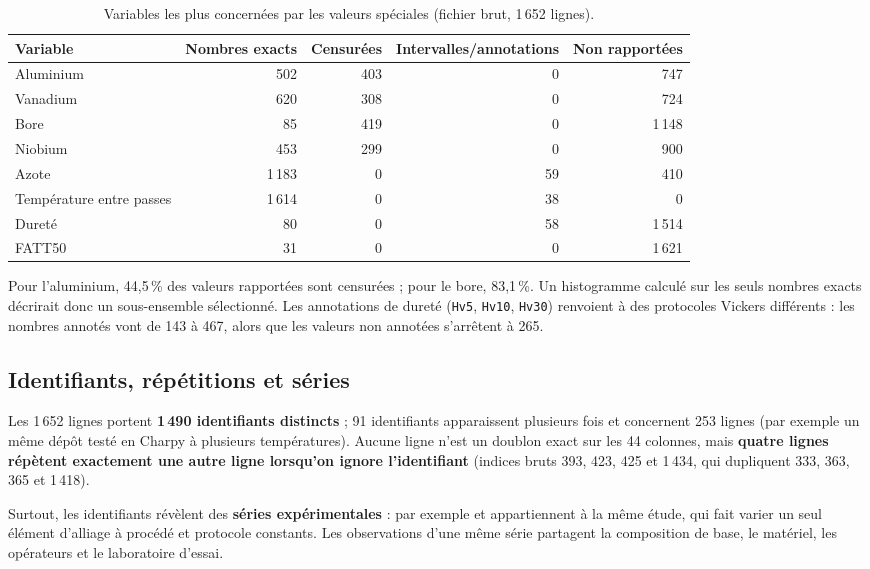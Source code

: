 \begin{table}[htbp]
\centering
\small
\caption{Variables les plus concernées par les valeurs spéciales (fichier brut, 1\,652 lignes).}
\label{tab:speciales}
\begin{tabular}{@{}lrrrr@{}}
\toprule
Variable & Nombres exacts & Censurées & Intervalles/annotations & Non rapportées \\
\midrule
Aluminium                 & 502   & 403 & 0  & 747   \\
Vanadium                  & 620   & 308 & 0  & 724   \\
Bore                      & 85    & 419 & 0  & 1\,148 \\
Niobium                   & 453   & 299 & 0  & 900   \\
Azote                     & 1\,183 & 0  & 59 & 410   \\
Température entre passes  & 1\,614 & 0  & 38 & 0     \\
Dureté                    & 80    & 0   & 58 & 1\,514 \\
FATT50                    & 31    & 0   & 0  & 1\,621 \\
\bottomrule
\end{tabular}
\end{table}

Pour l'aluminium, 44,5\,\% des valeurs rapportées sont censurées ; pour le bore,
83,1\,\%. Un histogramme calculé sur les seuls nombres exacts décrirait donc un
sous-ensemble sélectionné. Les annotations de dureté (\texttt{Hv5}, \texttt{Hv10},
\texttt{Hv30}) renvoient à des protocoles Vickers différents : les nombres
annotés vont de 143 à 467, alors que les valeurs non annotées s'arrêtent à 265.

\subsection{Identifiants, répétitions et séries}
\label{subsec:eda_series}

Les 1\,652 lignes portent \textbf{1\,490 identifiants distincts} ; 91 identifiants
apparaissent plusieurs fois et concernent 253 lignes (par exemple un même dépôt
testé en Charpy à plusieurs températures). Aucune ligne n'est un doublon exact sur
les 44 colonnes, mais \textbf{quatre lignes répètent exactement une autre ligne
lorsqu'on ignore l'identifiant} (indices bruts 393, 423, 425 et 1\,434, qui
dupliquent 333, 363, 365 et 1\,418).

Surtout, les identifiants révèlent des \textbf{séries expérimentales} : par exemple
 et 
appartiennent à la même étude, qui fait varier un seul élément d'alliage à
procédé et protocole constants. Les observations d'une même série partagent la
composition de base, le matériel, les opérateurs et le laboratoire d'essai.

